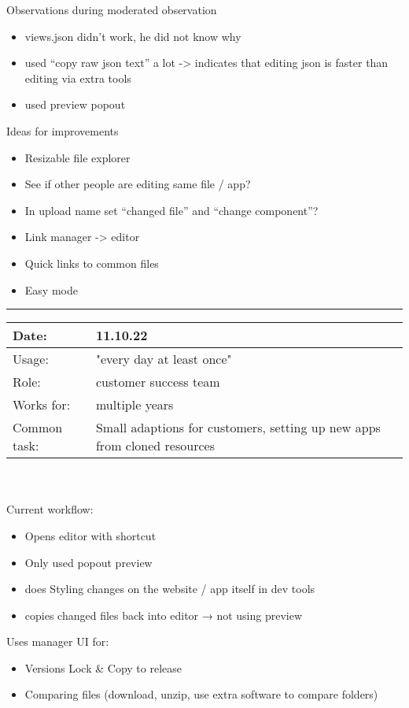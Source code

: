 Observations during moderated observation
\begin{itemize}[nosep]
  \item views.json didn't work, he did not know why
  \item used “copy raw json text” a lot -> indicates that editing json is faster than editing via extra tools
  \item used preview popout
\end{itemize}

Ideas for improvements
\begin{itemize}[nosep]
  \item Resizable file explorer
  \item See if other people are editing same file / app?
  \item In upload name set “changed file” and “change component”?
  \item Link manager -> editor
  \item Quick links to common files
  \item Easy mode
\end{itemize}
\bigskip
\hrule

\begin{tabularx}{\linewidth}{lX}
  Date: & 11.10.22 \\
  \hline
  Usage: & "every day at least once"\\
  \hline
  Role: & customer success team \\
  \hline
  Works for: & multiple years \\
  \hline
  Common task: &  Small adaptions for customers, setting up new apps from cloned resources
\end{tabularx}
\\\\


Current workflow:
\begin{itemize}[nosep]
  \item Opens editor with shortcut
  \item Only used popout preview
  \item does Styling changes on the website / app itself in dev tools
  \item copies changed files back into editor → not using preview
\end{itemize}

Uses manager UI for:
\begin{itemize}[nosep]
  \item Versions Lock \& Copy to release
  \item Comparing files (download, unzip, use extra software to compare folders)
\end{itemize}

